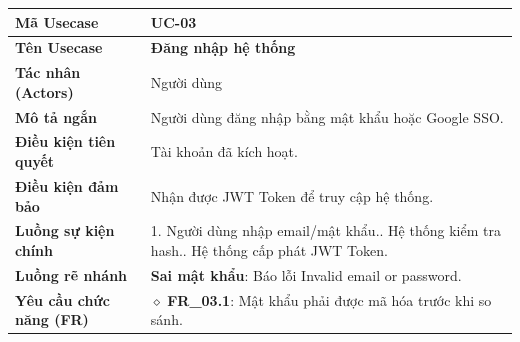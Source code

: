 \begin{table}[H]
\renewcommand{\arraystretch}{1.3}
\centering
\begin{tabularx}{\textwidth}{|p{4.5cm}|X|}
\hline
\cellcolor{gray!15}\bfseries Mã Usecase & \textbf{UC-03} \\ \hline
\cellcolor{gray!15}\bfseries Tên Usecase & \textbf{Đăng nhập hệ thống} \\ \hline
\cellcolor{gray!15}\bfseries Tác nhân (Actors) & Người dùng \\ \hline
\cellcolor{gray!15}\bfseries Mô tả ngắn & Người dùng đăng nhập bằng mật khẩu hoặc Google SSO. \\ \hline
\cellcolor{gray!15}\bfseries Điều kiện tiên quyết & Tài khoản đã kích hoạt. \\ \hline
\cellcolor{gray!15}\bfseries Điều kiện đảm bảo & Nhận được JWT Token để truy cập hệ thống. \\ \hline
\cellcolor{gray!15}\bfseries Luồng sự kiện chính & 1. Người dùng nhập email/mật khẩu.\newline 2. Hệ thống kiểm tra hash.\newline 3. Hệ thống cấp phát JWT Token. \\ \hline
\cellcolor{gray!15}\bfseries Luồng rẽ nhánh & \textbf{Sai mật khẩu}: Báo lỗi Invalid email or password. \\ \hline
\cellcolor{gray!15}\bfseries Yêu cầu chức năng (FR) & $\diamond$ \textbf{FR\_03.1}: Mật khẩu phải được mã hóa trước khi so sánh. \\ \hline
\end{tabularx}
\end{table}

